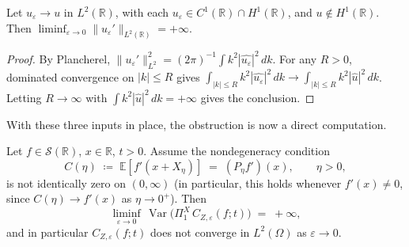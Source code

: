 \documentclass[EJP]{ejpecp}
\newcommand{\R}{\mathbb{R}}
\renewcommand{\E}{\mathbb{E}}
\newcommand{\IBM}{Z}
\newcommand{\Pir}{\Pi}
\DeclareMathOperator{\Var}{Var}
\begin{document}
\begin{lemma}
\label{lem:H1-blowup}
Let $u_\varepsilon\to u$ in $L^{2}(\R)$, with each
$u_\varepsilon\in C^{1}(\R)\cap H^{1}(\R)$, and $u\notin H^{1}(\R)$.
Then $\liminf_{\varepsilon\to 0}\|u_\varepsilon'\|_{L^{2}(\R)}=+\infty$.
\end{lemma}

\begin{proof}
By Plancherel,
$\|u_\varepsilon'\|_{L^{2}}^{2}=(2\pi)^{-1}\int k^{2}|\widehat{u_\varepsilon}|^{2}\,dk$.
For any $R>0$, dominated convergence on $|k|\le R$ gives
$\int_{|k|\le R}k^{2}|\widehat{u_\varepsilon}|^{2}\,dk\to
\int_{|k|\le R}k^{2}|\widehat u|^{2}\,dk$. Letting $R\to\infty$ with
$\int k^{2}|\widehat u|^{2}\,dk=+\infty$ gives the conclusion.
\end{proof}

With these three inputs in place, the obstruction is now a direct
computation.

\begin{theorem}
\label{thm:var-divergence}
Let $f\in\mathscr S(\R)$, $x\in\R$, $t>0$. Assume the nondegeneracy
condition
\begin{equation}\label{eq:nondegen}
  C(\eta)\;\coloneqq\;\E[f'(x+X_\eta)]\;=\;(P_\eta f')(x),
  \qquad\eta>0,
\end{equation}
is not identically zero on $(0,\infty)$ (in particular, this holds
whenever $f'(x)\ne 0$, since $C(\eta)\to f'(x)$ as $\eta\to 0^{+}$).
Then
\begin{equation}\label{eq:var-diverges}
  \liminf_{\varepsilon\to 0}\,
   \Var\bigl(\Pir_1^{X}\,C_{\IBM,\varepsilon}(f;t)\bigr)\;=\;+\infty,
\end{equation}
and in particular $C_{\IBM,\varepsilon}(f;t)$ does not converge in
$L^{2}(\Omega)$ as $\varepsilon\to 0$.
\end{theorem}
\end{document}
